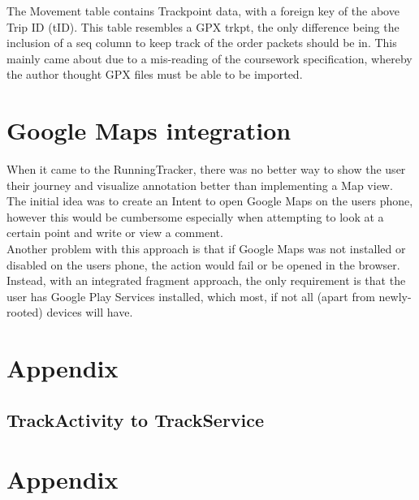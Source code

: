 \documentclass[11pt]{article}
\begin{document}
The Movement table contains Trackpoint data, with a foreign key of the above Trip ID (tID). This table resembles a GPX trkpt, the only difference being the inclusion of a seq column to keep track of the order packets should be in. This mainly came about due to a mis-reading of the coursework specification, whereby the author thought GPX files must be able to be imported.

\newpage


\section{Google Maps integration}
When it came to the RunningTracker, there was no better way to show the user their journey and visualize annotation better than implementing a Map view. \\

The initial idea was to create an Intent to open Google Maps on the users phone, however this would be cumbersome especially when attempting to look at a certain point and write or view a comment.\\


Another problem with this approach is that if Google Maps was not installed or disabled on the users phone, the action would fail or be opened in the browser. Instead, with an integrated fragment approach, the only requirement is that the user has Google Play Services installed, which most, if not all (apart from newly-rooted) devices will have.\\



\section{Appendix}

\subsection{TrackActivity to TrackService}


















\newpage
\section{Appendix}
\end{document}
